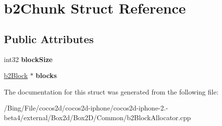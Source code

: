 \hypertarget{structb2_chunk}{\section{b2\-Chunk Struct Reference}
\label{structb2_chunk}
}
\subsection*{Public Attributes}
\begin{DoxyCompactItemize}
\item 
\hypertarget{structb2_chunk_a731df6d026298426622990c251cf742a}{int32 {\bfseries block\-Size}}\label{structb2_chunk_a731df6d026298426622990c251cf742a}

\item 
\hypertarget{structb2_chunk_aa45617a36287b3dea2130c426cfd42d2}{\hyperlink{structb2_block}{b2\-Block} $\ast$ {\bfseries blocks}}\label{structb2_chunk_aa45617a36287b3dea2130c426cfd42d2}

\end{DoxyCompactItemize}


The documentation for this struct was generated from the following file\-:\begin{DoxyCompactItemize}
\item 
/\-Bing/\-File/cocos2d/cocos2d-\/iphone/cocos2d-\/iphone-\/2.-\/beta4/external/\-Box2d/\-Box2\-D/\-Common/b2\-Block\-Allocator.\-cpp\end{DoxyCompactItemize}
